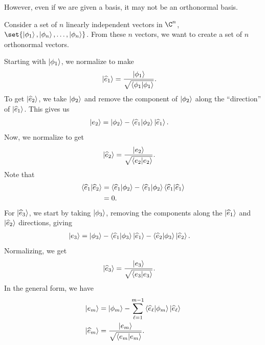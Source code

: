 \documentclass[10pt]{mypackage}
\begin{document}
However, even if we are given a basis, it may not be an orthonormal basis.
\begin{method}
Consider a set of $n$ linearly independent vectors in $\C^n$, $\set{\ket{\phi_{1}},\ket{\phi_n},\dots,\ket{\phi_{n}}}$. From these $n$ vectors, we want to create a set of $n$ orthonormal vectors.\newline

Starting with $ \ket{\phi_1} $, we normalize to make
\begin{align*}
  \ket{ \widehat{e}_1 } &= \frac{\ket{\phi_1}}{\sqrt{\braket{\phi_1}{\phi_1}}}.
\end{align*}
To get $ \ket{\widehat{e}_2} $, we take $\ket{\phi_2}$ and remove the component of $\ket{\phi_2}$ along the ``direction'' of $\ket{\widehat{e}_1}$. This gives us
\begin{align*}
  \ket{e_2} &= \ket{\phi_2}  - \braket{\widehat{e}_1}{\phi_2}\ket{\widehat{e}_1}.
\end{align*}
Now, we normalize to get
\begin{align*}
  \ket{\widehat{e}_2} &= \frac{ \ket{e_2} }{\sqrt{\braket{e_2}{e_2}}}.
\end{align*}
Note that
\begin{align*}
  \braket{\widehat{e}_1}{\widehat{e}_2} &= \braket{\widehat{e}_1}{\phi_2} - \braket{\widehat{e}_1}{\phi_2}\braket{\widehat{e}_1}{\widehat{e}_1}\\
                                &= 0.
\end{align*}
For $ \ket{ \widehat{e}_3 } $, we start by taking $\ket{\phi_3}$, removing the components along the $\ket{\widehat{e}_1}$ and $\ket{\widehat{e}_2}$ directions, giving
\begin{align*}
  \ket{e_3} &= \ket{\phi_3} - \braket{\widehat{e}_1}{\phi_3}\ket{\widehat{e}_1} - \braket{\widehat{e}_2}{\phi_3}\ket{\widehat{e}_2}.
\end{align*}
Normalizing, we get
\begin{align*}
  \ket{\widehat{e}_3} &= \frac{\ket{e_3}}{\sqrt{\braket{e_3}{e_3}}}.
\end{align*}
In the general form, we have
\begin{align*}
  \ket{e_m} &= \ket{\phi_m} - \sum_{\ell=1}^{m-1}\braket{\widehat{e}_{\ell}}{\phi_m}\ket{\widehat{e}_{\ell}}\\
  \ket{\widehat{e}_m} &= \frac{\ket{e_m}}{\sqrt{\braket{e_m}{e_m}}}.
\end{align*}
\end{method}
\end{document}
